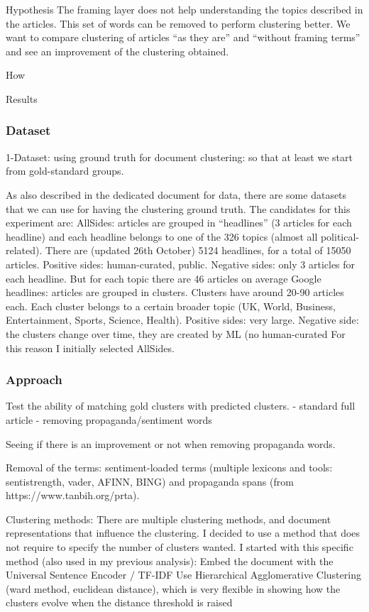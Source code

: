 Hypothesis
The framing layer does not help understanding the topics described in the articles. This set of words can be removed to perform clustering better.
We want to compare clustering of articles “as they are” and “without framing terms” and see an improvement of the clustering obtained.


How

Results

\subsubsection{Dataset}

1-Dataset: using ground truth for document clustering: so that at least we start from gold-standard groups.

As also described in the dedicated document for data, there are some datasets that we can use for having the clustering ground truth. The candidates for this experiment are:
AllSides: articles are grouped in “headlines” (3 articles for each headline) and each headline belongs to one of the 326 topics (almost all political-related). There are (updated 26th October) 5124 headlines, for a total of 15050 articles. Positive sides: human-curated, public. Negative sides: only 3 articles for each headline. But for each topic there are 46 articles on average
Google headlines: articles are grouped in clusters. Clusters have around 20-90 articles each. Each cluster belongs to a certain broader topic (UK, World, Business, Entertainment, Sports, Science, Health). Positive sides: very large. Negative side: the clusters change over time, they are created by ML (no human-curated
For this reason I initially selected AllSides.

\subsubsection{Approach}

Test the ability of matching gold clusters with predicted clusters.
- standard full article
- removing propaganda/sentiment words

Seeing if there is an improvement or not when removing propaganda words.

Removal of the terms: sentiment-loaded terms (multiple lexicons and tools: sentistrength, vader, AFINN, BING) and propaganda spans (from https://www.tanbih.org/prta).

Clustering methods:
There are multiple clustering methods, and document representations that influence the clustering. I decided to use a method that does not require to specify the number of clusters wanted.
I started with this specific method (also used in my previous analysis):
Embed the document with the Universal Sentence Encoder / TF-IDF
Use Hierarchical Agglomerative Clustering (ward method, euclidean distance), which  is very flexible in showing how the clusters evolve when the distance threshold is raised


